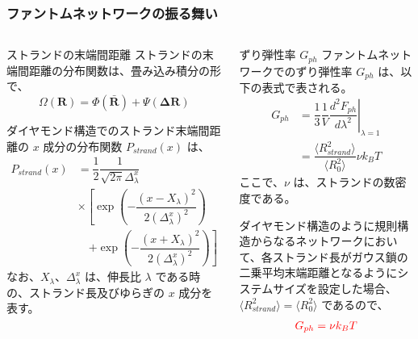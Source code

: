 \documentclass[11pt, dvipdfmx]{beamer}
\begin{document}
\begin{appendix}
\begin{frame}
\begin{columns}[totalwidth=1\textwidth]
\end{columns}

\end{frame}


\begin{frame}
\frametitle{ファントムネットワークの振る舞い}

\begin{columns}[totalwidth=1\textwidth]
\scriptsize
\begin{block}{ストランドの末端間距離}
ストランドの末端間距離の分布関数は、畳み込み積分の形で、
\vspace{-3mm}
\begin{equation*}
\Omega(\bm{R}) = \Phi(\bar{\bm{R}}) + \Psi(\bm{\Delta R})
\end{equation*}

ダイヤモンド構造でのストランド末端間距離の $x$ 成分の分布関数 $P_{strand}(x)$ は、\vspace{-3mm}
\begin{align*}
P_{strand}(x) 
&= \dfrac{1}{2}\dfrac{1}{\sqrt{2\pi}\Delta_{\lambda}^x} \\
&\times \left[ \exp\left(-\dfrac{(x-X_{\lambda})^2}{2(\Delta_{\lambda}^x)^2} \right) \right. \\
&\quad \left. + \exp\left(-\dfrac{(x+X_{\lambda})^2}{2(\Delta_{\lambda}^x)^2} \right) \right]
\end{align*}
なお、$X_{\lambda}$、$\Delta_{\lambda}^x$ は、伸長比 $\lambda$ である時の、ストランド長及びゆらぎの $x$ 成分を表す。
\end{block}

\scriptsize
\begin{block}{ずり弾性率 $G_{ph}$}
ファントムネットワークでのずり弾性率 $G_{ph}$ は、以下の表式で表される。
\vspace{-3mm}
\begin{align*}
G_{ph} &= \dfrac{1}{3} \dfrac{1}{V} \left. \dfrac{d^2 F_{ph}}{d \lambda^2} \right|_{\lambda = 1}\\
&=\dfrac{\langle R_{strand}^2 \rangle}{\langle R_0^2 \rangle} \nu k_B T
\end{align*}
ここで、$\nu$ は、ストランドの数密度である。

\vspace{3mm}
ダイヤモンド構造のように規則構造からなるネットワークにおいて、各ストランド長がガウス鎖の二乗平均末端距離となるようにシステムサイズを設定した場合、$\langle R_{strand}^2 \rangle = \langle R_0^2 \rangle$ であるので、
\vspace{-3mm}
\begin{align*}
\color{red}
G_{ph}= \nu k_B T
\end{align*}


\end{block}
\end{columns}
\end{frame}
\end{appendix}
\end{document}
